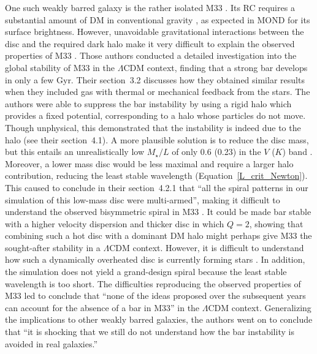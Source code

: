 \documentclass[fleqn,usenatbib,useAMS]{mnras} %
\begin{document}
One such weakly barred galaxy is the rather isolated M33 \citep{Corbelli_Walterbos_2007, Kam_2015}. Its RC requires a substantial amount of DM in conventional gravity \citep{Sanders_1996, Famaey_McGaugh_2012, Kam_2017}, as expected in MOND for its surface brightness. However, unavoidable gravitational interactions between the disc and the required dark halo make it very difficult to explain the observed properties of M33 \citep*{Sellwood_2019}. Those authors conducted a detailed investigation into the global stability of M33 in the $\Lambda$CDM context, finding that a strong bar develops in only a few Gyr. Their section~3.2 discusses how they obtained similar results when they included gas with thermal or mechanical feedback from the stars. The authors were able to suppress the bar instability by using a rigid halo which provides a fixed potential, corresponding to a halo whose particles do not move. Though unphysical, this demonstrated that the instability is indeed due to the halo (see their section~4.1). A more plausible solution is to reduce the disc mass, but this entails an unrealistically low $M_{\star}/L$ of only 0.6 (0.23) in the $V$ ($K$) band \citep{Conroy_2013, Schombert_2018}. Moreover, a lower mass disc would be less maximal and require a larger halo contribution, reducing the least stable wavelength (Equation~\ref{L_crit_Newton}). This caused \citet{Sellwood_2019} to conclude in their section~4.2.1 that ``all the spiral patterns in our simulation of this low-mass disc were multi-armed'', making it difficult to understand the observed bisymmetric spiral in M33 \citep{Smith_1984, Elmegreen_1992, Regan_Vogel_1994, Jarrett_2003, Corbelli_Walterbos_2007}. It could be made bar stable with a higher velocity dispersion and thicker disc in which $Q = 2$, showing that combining such a hot disc with a dominant DM halo might perhaps give M33 the sought-after stability in a $\Lambda$CDM context. However, it is difficult to understand how such a dynamically overheated disc is currently forming stars \citep{Verley_2009}. In addition, the simulation does not yield a grand-design spiral because the least stable wavelength is too short. The difficulties reproducing the observed properties of M33 led \citet{Sellwood_2019} to conclude that ``none of the ideas proposed over the subsequent years can account for the absence of a bar in M33'' in the $\Lambda$CDM context. Generalizing the implications to other weakly barred galaxies, the authors went on to conclude that ``it is shocking that we still do not understand how the bar instability is avoided in real galaxies.''
\end{document}
